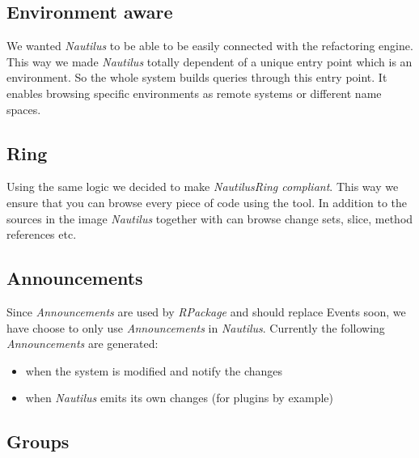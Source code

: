 \documentclass[a4paper,10pt,twoside]{book}
\newcommand\nautilus{\emph{Nautilus}\xspace}
\begin{document}
\subsection*{Environment aware}

We wanted \nautilus to be able to be easily connected with the refactoring engine. This way we made \nautilus totally dependent of a unique entry point which is an environment. So the whole system builds queries through this entry point. It enables browsing specific environments as remote systems or different name spaces.

\subsection*{Ring}

Using the same logic we decided to make \nautilus \emph{Ring compliant}. This way we ensure that you can browse every piece of code using the tool. In addition to the sources in the image \nautilus together with  can browse change sets, slice, method references etc.

\subsection*{Announcements}

Since \emph{Announcements} are used by \emph{RPackage} and should replace Events soon, we have choose to only use \emph{Announcements} in \nautilus. Currently the following \emph{Announcements} are generated:
\begin{itemize}
    \item when the system is modified and notify the changes
	\item when \nautilus emits its own changes (for plugins by example)
\end{itemize}

\subsection*{Groups}
\end{document}
